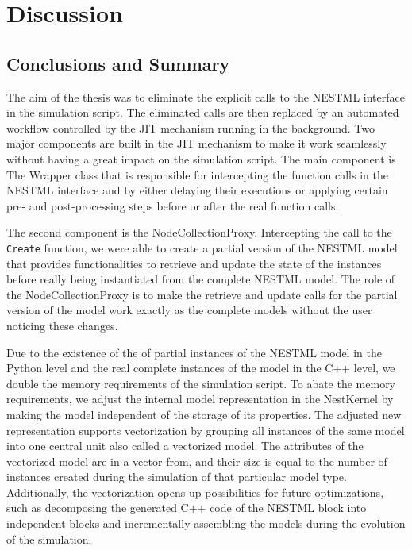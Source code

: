 \chapter{Discussion}
 \label{chap:disc}
 \section{Conclusions and Summary}

The aim of the thesis was to eliminate the explicit calls to the NESTML interface in the simulation script. The eliminated calls are then replaced by an automated workflow controlled by the JIT mechanism running in the background. Two major components are built in the JIT mechanism to make it work seamlessly without having a great impact on the simulation script. The main component is The Wrapper class that is responsible for intercepting the function calls in the NESTML interface and by either delaying their executions or applying certain pre- and post-processing steps before or after the real function calls.

The second component is the NodeCollectionProxy. Intercepting the call to the \texttt{Create} function, we were able to create a partial version of the NESTML model that provides functionalities to retrieve and update the state of the instances before really being instantiated from the complete NESTML model. The role of the NodeCollectionProxy is to make the retrieve and update calls for the partial version of the model work exactly as the complete models without the user noticing these changes. 

Due to the existence of the of partial instances of the NESTML model in the Python level and the real complete instances of the model in the C++ level, we double the memory requirements of the simulation script. To abate the memory requirements, we adjust the internal model representation in the NestKernel by making the model independent of the storage of its properties. The adjusted new representation supports vectorization by grouping all instances of the same model into one central unit also called a vectorized model. The attributes of the vectorized model are in a vector from, and their size is equal to the number of instances created during the simulation of that particular
model type. Additionally, the vectorization opens up possibilities for future optimizations, such as decomposing the generated C++ code of the NESTML block into independent blocks and incrementally assembling the models during the evolution of the simulation.

